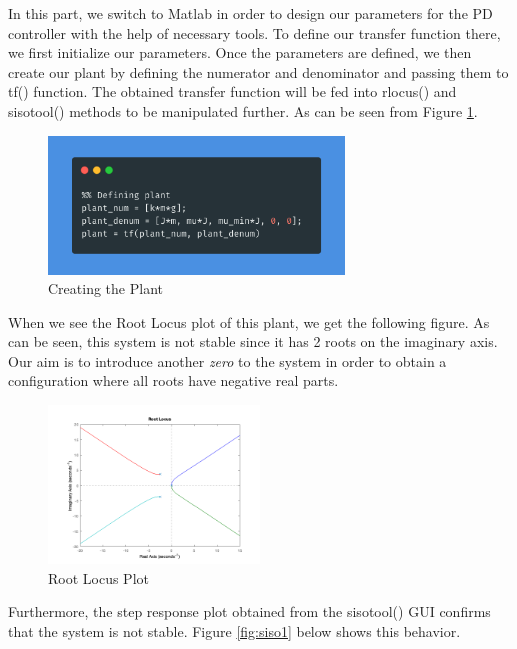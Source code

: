 In this part, we switch to Matlab in order to design our parameters for the PD controller with the help of necessary tools. To define our transfer function there, we first initialize our parameters. Once the parameters are defined, we then create our plant by defining the numerator and denominator and passing them to tf() function. The obtained transfer function will be fed into rlocus() and sisotool() methods to be manipulated further. As can be seen from Figure \ref{fig:plant_ss}.

\begin{figure}[H]
    \centering
    \includegraphics[width=0.7\textwidth]{images/plant_def.png}
    \caption{Creating the Plant}
    \label{fig:plant_ss}
\end{figure}

When we see the \textit{}{Root Locus plot} of this plant, we get the following figure. As can be seen, this system is not stable since it has 2 roots on the imaginary axis. Our aim is to introduce another \textit{zero} to the system in order to obtain a configuration where all roots have negative real parts.

\begin{figure}[H]
    \centering
    \includegraphics[width=0.5\textwidth]{images/initial_rlocus.png}
    \caption{Root Locus Plot}
    \label{fig:initial_locus}
\end{figure}


Furthermore, the step response plot obtained from the sisotool() GUI confirms that the system is not stable. Figure \ref{fig:siso1} below shows this behavior.

